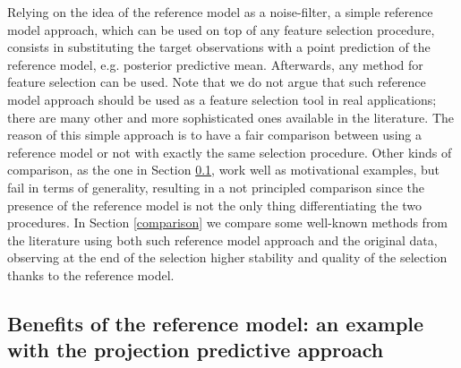 \documentclass[american,]{article}
\theoremstyle{definition}
\begin{document}

Relying on the idea of the reference model as a noise-filter, a simple reference model approach, which can be used on top of any feature selection procedure, consists in substituting the target observations with a point prediction of the reference model, e.g. posterior predictive mean. Afterwards, any method for feature selection can be used. Note that we do not argue that such reference model approach should be used as a feature selection tool in real applications; there are many other and more sophisticated ones available in the literature. The reason of this simple approach is to have a fair comparison between using a reference model or not with exactly the same selection procedure. Other kinds of comparison, as the one in Section \ref{projection}, work well as motivational examples, but fail in terms of generality, resulting in a not principled comparison since the presence of the reference model is not the only thing differentiating the two procedures. In Section \ref{comparison} we compare some well-known methods from the literature using both such reference model approach and the original data, observing at the end of the selection higher stability and quality of the selection thanks to the reference model.

\hypertarget{projection}{%
\subsection{Benefits of the reference model: an example with the projection predictive approach}\label{projection}}
\end{document}
